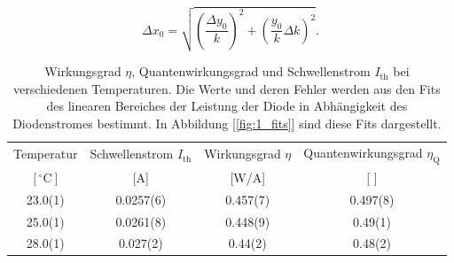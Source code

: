 \documentclass[a4paper,10pt]{scrartcl} %
\begin{document}
\begin{equation}
\Delta x_0 = \sqrt{\left(\frac{\Delta y_0}{k}\right)^2 + \left(\frac{y_0}{k}\Delta k \right)^2}.
\end{equation}

\begin{table}
\centering
\begin{tabular}{||c|c|c|c||}
Temperatur & Schwellenstrom $I_{\text{th}}$ & Wirkungsgrad $\eta$ & Quantenwirkungsgrad $\eta_{\text{Q}}$\\
$[ ^\circ{\text{C}}]$ & [A]	& [W/A] & [ ]\\
\hline
23.0(1)	& 0.0257(6) & 0.457(7) & 0.497(8)\\
25.0(1) & 0.0261(8) & 0.448(9) & 0.49(1)\\
28.0(1) & 0.027(2) &  0.44(2) & 0.48(2)\\
\end{tabular}
\caption{Wirkungsgrad $\eta$, Quantenwirkungsgrad und Schwellenstrom $I_{\text{th}}$ bei verschiedenen Temperaturen. Die Werte und deren Fehler werden aus den Fits des linearen Bereiches der Leistung der Diode in Abhängigkeit des Diodenstromes bestimmt. In Abbildung [\ref{fig:1_fits}] sind diese Fits dargestellt.}
\label{tab:1}
\end{table}
\end{document}
